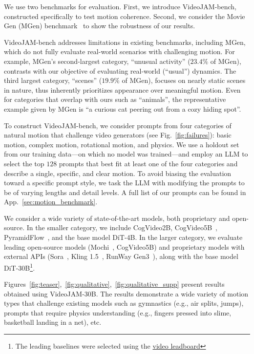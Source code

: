 We use two benchmarks for evaluation. First, we introduce VideoJAM-bench, constructed specifically to test motion coherence. Second, we consider the Movie Gen (MGen) benchmark~\cite{moviegen} to show the robustness of our results.

VideoJAM-bench addresses limitations in existing benchmarks, including MGen, which do not fully evaluate real-world scenarios with challenging motion. 
For example, MGen’s second-largest category, ``unusual activity'' ($23.4\%$ of MGen), contrasts with our objective of evaluating real-world (``usual'') dynamics. The third largest category, ``scenes'' ($19.9\%$ of MGen), focuses on nearly static scenes in nature, thus inherently prioritizes appearance over meaningful motion. Even for categories that overlap with ours such as ``animals'', the representative example given by MGen is ``a curious cat peering out from a cozy hiding spot''.

To construct VideoJAM-bench, we consider prompts from four categories of natural motion that challenge video generators (see Fig.~\ref{fig:failures}): basic motion, complex motion, rotational motion, and physics. We use a holdout set from our training data—on which no model was trained—and employ an LLM to select the top $128$ prompts that best fit at least one of the four categories and describe a single, specific, and clear motion. To avoid biasing the evaluation toward a specific prompt style, we task the LLM with modifying the prompts to be of varying lengths and detail levels. 
A full list of our prompts can be found in App.~\ref{sec:motion_benchmark}. 

 We consider a wide variety of state-of-the-art models, both proprietary and open-source. In the smaller category, we include CogVideo2B, CogVideo5B~\cite{hong2022cogvideo}, PyramidFlow~\cite{Pyramidal_Flow}, and the base model DiT-4B. In the larger category, we evaluate leading open-source models (Mochi~\cite{genmo2024mochi}, CogVideo5B) and proprietary models with external APIs (Sora~\cite{sora}, Kling 1.5~\cite{kling}, RunWay Gen3~\cite{gen3}), along with the base model DiT-30B\footnote{The leading baselines were selected using the \href{https://huggingface.co/spaces/ArtificialAnalysis/Video-Generation-Arena-Leaderboard}{video leadboard}}. 


Figures~\ref{fig:teaser},~\ref{fig:qualitative},~\ref{fig:qualitative_supp} present results obtained using VideoJAM-30B. The results demonstrate a wide variety of motion types that challenge existing models such as gymnastics (e.g., air splits, jumps), prompts that require physics understanding (e.g., fingers pressed into slime, basketball landing in a net), etc.  

